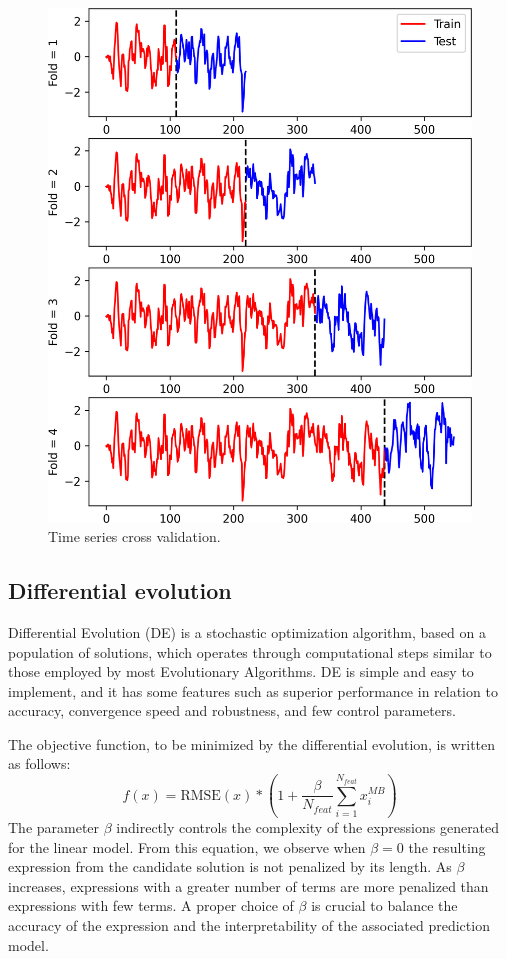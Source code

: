 \documentclass[smallextended]{svjour3}       %
\begin{document}
\begin{figure}[!htb]\centering
\includegraphics[width=0.6\linewidth]{./tscv.png}
\caption{\label{fig:tscv} Time series cross validation.}
\end{figure}


\subsection{Differential evolution}

Differential Evolution (DE) is a stochastic optimization algorithm, based on a population of solutions, which operates through computational steps similar to those employed by most Evolutionary Algorithms.
DE is simple and easy to implement, and it has some features such as superior performance in relation to accuracy, convergence speed and robustness, and few control parameters. %


The objective function, to be minimized by the differential evolution, is written as follows:
\begin{equation}
 f(x) = \mbox{RMSE}(x) * \left( 1 +  \frac{\beta}{N_{feat}} \sum_{i=1}^{N_{feat}} x_i^{MB}\right) 
\end{equation}
The parameter $\beta$ indirectly controls the complexity of the expressions generated for the linear model. From this equation, we observe when $\beta=0$ the resulting expression from the candidate solution is not penalized by its length.
As $\beta$ increases, expressions with a greater number of terms are more penalized than expressions with few terms. A proper choice of $\beta$ is crucial to balance the accuracy of the expression and the interpretability of the associated prediction model.
\end{document}
